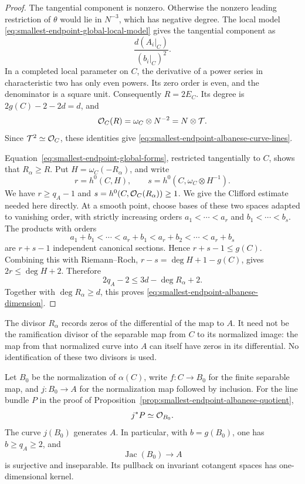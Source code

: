 \begin{proof}
The tangential component is nonzero.  Otherwise the nonzero leading
restriction of $\theta$ would lie in $N^{-3}$, which has negative
degree.
The local model
\eqref{eq:smallest-endpoint-global-local-model} gives the
tangential component as
\[
 \frac{d(A_i|_C)}{(b_i|_C)^2}.
\]
In a completed local parameter on $C$, the derivative of a power
series in characteristic two has only even powers.  Its zero order
is even, and the denominator is a square unit.
Consequently $R=2E_C$.
Its degree is $2g(C)-2-2d=d$, and
\[
 \mathcal O_C(R)=\omega_C\otimes N^{-2}=N\otimes\mathcal T.
\]
Since $\mathcal T^2\simeq\mathcal O_C$, these identities give
\eqref{eq:smallest-endpoint-albanese-curve-lines}.

Equation~\eqref{eq:smallest-endpoint-global-forms}, restricted
tangentially to $C$, shows that $R_\alpha\ge R$.
Put $H=\omega_C(-R_\alpha)$, and write
\[
 r=h^0(C,H),\qquad s=h^0(C,\omega_C\otimes H^{-1}).
\]
We have $r\ge q_A-1$ and
$s=h^0(C,\mathcal O_C(R_\alpha))\ge1$.
We give the Clifford estimate needed here directly.
At a smooth point, choose bases of these two spaces adapted to
vanishing order, with strictly increasing orders
$a_1<\cdots<a_r$ and $b_1<\cdots<b_s$.
The products with orders
\[
 a_1+b_1<\cdots<a_r+b_1<a_r+b_2<\cdots<a_r+b_s
\]
are $r+s-1$ independent canonical sections.
Hence $r+s-1\le g(C)$.
Combining this with Riemann--Roch,
$r-s=\deg H+1-g(C)$, gives
$2r\le\deg H+2$.
Therefore
\[
 2q_A-2\le3d-\deg R_\alpha+2.
\]
Together with $\deg R_\alpha\ge d$, this proves
\eqref{eq:smallest-endpoint-albanese-dimension}.
\end{proof}

\begin{remark}
\label{rem:smallest-endpoint-albanese-zero-divisor-scope}
The divisor $R_\alpha$ records zeros of the differential of the map
to $A$.  It need not be the ramification divisor of the separable
map from $C$ to its normalized image: the map from that normalized
curve into $A$ can itself have zeros in its differential.
No identification of these two divisors is used.
\end{remark}

\begin{proposition}
\label{prop:smallest-endpoint-albanese-image}
Let $B_0$ be the normalization of $\alpha(C)$, write
$f:C\to B_0$ for the finite separable map, and
$j:B_0\to A$ for the normalization map followed by inclusion.
For the line bundle $P$ in the proof of
Proposition~\ref{prop:smallest-endpoint-albanese-quotient},
\begin{equation}\label{eq:smallest-endpoint-albanese-image-torsion}
 j^*P\simeq\mathcal O_{B_0}.
\end{equation}
The curve $j(B_0)$ generates $A$.  In particular, with $b=g(B_0)$,
one has $b\ge q_A\ge2$, and
\[
 \operatorname{Jac}(B_0)\longrightarrow A
\]
is surjective and inseparable.  Its pullback on invariant
cotangent spaces has one-dimensional kernel.
\end{proposition}

